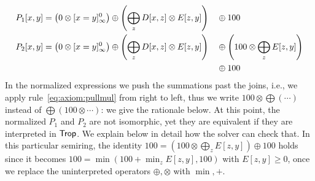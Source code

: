 \begin{ex}[APSP100]
{\begin{alignat*}{2}
  P_{1}[x,y] & =  \left(0 \otimes \totrop{x=y}\right) \oplus \left(\bigoplus_{z} D[x,z] \otimes E[z,y]\right) && \oplus 100 \\
  P_{2}[x,y] %
             & = \left(0 \otimes \totrop{x=y}\right) \oplus \left(\bigoplus_{z} D[x,z] \otimes E[z,y]\right) && \oplus \left(100 \otimes\bigoplus_{z} E[z,y]\right) \\
             &&& \oplus 100
\end{alignat*}
}
%
In the normalized expressions we push the summations past the joins,
i.e., we apply rule~\eqref{eq:axiom:pullmul} from right to left, thus
we write $100 \otimes \bigoplus (\cdots)$ instead of
$\bigoplus (100 \otimes \cdots)$: we give the rationale below.  At
this point, the normalized $P_{1}$ and $P_{2}$ are not isomorphic, yet
they are equivalent if they are interpreted in $\text{\sf Trop}$.
We explain below in detail how the solver can check that.
In this particular semiring,
the
identity
$
  100 = \left(100 \otimes \bigoplus_{z} E[z,y]\right)  \oplus 100
$
holds since it becomes
$
100 = \min(100 + \min_{z} E[z,y],100)
$
with $E[z,y] \geq 0$,
once we replace the uninterpreted operators
$\oplus, \otimes$ with $\min, +$.
%
\end{ex}



